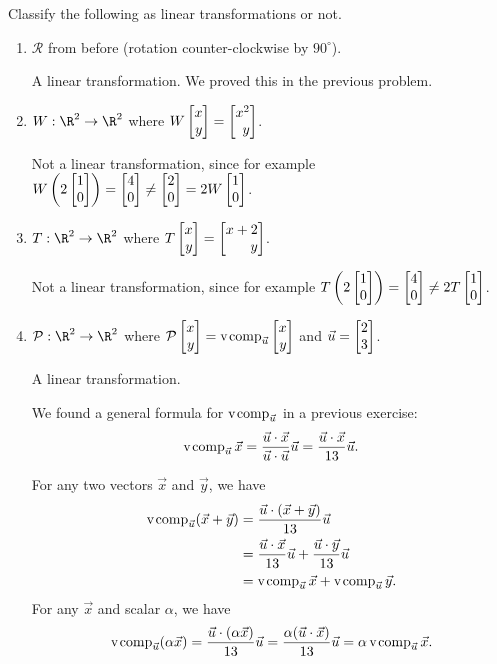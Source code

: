\documentclass{problemset}
\begin{document}
	\begin{parts}
		\item Classify the following as linear transformations or not.
			\begin{enumerate}
				\item $\mathcal R$ from before (rotation counter-clockwise by $90^\circ$).
					\begin{solution}
						A linear transformation. We proved this in the previous problem.
					\end{solution}
				\item $W:\R^2\to\R^2$ where $W\mat{x\\y}=\mat{x^2\\y}$.
					\begin{solution}
						Not a linear transformation, since for example
						$W\left(2\mat{1\\0}\right)=\mat{4\\0}\neq\mat{2\\0}=2W\mat{1\\0}$.
					\end{solution}
				\item $T:\R^2\to\R^2$ where $T\mat{x\\y}=\mat{x+2\\y}$.
					\begin{solution}
						Not a linear transformation, since for example
						$T\left(2\mat{1\\0}\right) = \mat{4\\0} \neq 2T\mat{1\\0}$.
					\end{solution}
				\item $\mathcal P:\R^2\to\R^2$ where
					$\mathcal P\mat{x\\y}=\Comp_{\vec u}\mat{x\\y}$ and
					$\vec u=\mat{2\\3}$.
					\begin{solution}
						A linear transformation.

						We found a general formula for $\operatorname{\operatorname{v\hspace{1pt}comp}}_{\vec u}$ in a previous
						exercise:
						\[
							\operatorname{\operatorname{v\hspace{1pt}comp}}_{\vec u}\vec x
							=\frac{\vec u\cdot\vec x}{\vec u\cdot\vec u}\vec u
							=\frac{\vec u\cdot\vec x}{13}\vec u.
						\]

						For any two vectors $\vec x$ and $\vec y$, we have
						\begin{align*}
							\operatorname{\operatorname{v\hspace{1pt}comp}}_{\vec u}(\vec x + \vec y)&=\frac{\vec u\cdot(\vec x + \vec y)}{13}\vec u\\
							&=\frac{\vec u\cdot\vec x}{13}\vec u + \frac{\vec u\cdot\vec y}{13}\vec u\\
							&=\operatorname{\operatorname{v\hspace{1pt}comp}}_{\vec u}\vec x + \operatorname{\operatorname{v\hspace{1pt}comp}}_{\vec u}\vec y.
						\end{align*}
						For any $\vec x$ and scalar $\alpha$, we have
						\[
							\operatorname{\operatorname{v\hspace{1pt}comp}}_{\vec u}(\alpha\vec x)
							=\frac{\vec u\cdot(\alpha\vec x)}{13}\vec u
							=\frac{\alpha(\vec u\cdot\vec x)}{13}\vec u
							=\alpha\operatorname{\operatorname{v\hspace{1pt}comp}}_{\vec u}\vec x.
						\]
					\end{solution}
			\end{enumerate}
	\end{parts}
\end{document}
